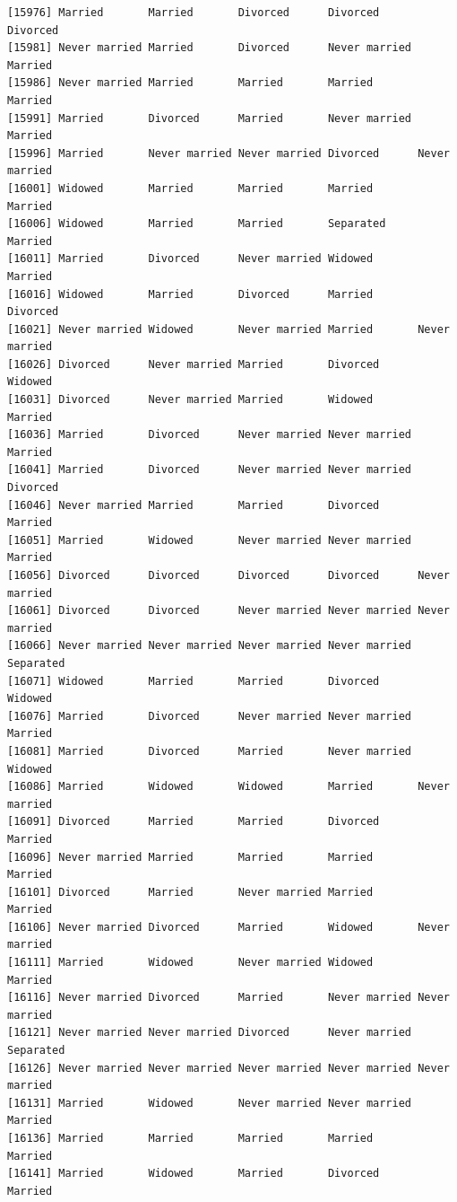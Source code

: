 \documentclass[
  letterpaper,
  DIV=11,
  numbers=noendperiod,
  oneside]{scrartcl}
\begin{document}
\begin{verbatim}
[15976] Married       Married       Divorced      Divorced      Divorced     
[15981] Never married Married       Divorced      Never married Married      
[15986] Never married Married       Married       Married       Married      
[15991] Married       Divorced      Married       Never married Married      
[15996] Married       Never married Never married Divorced      Never married
[16001] Widowed       Married       Married       Married       Married      
[16006] Widowed       Married       Married       Separated     Married      
[16011] Married       Divorced      Never married Widowed       Married      
[16016] Widowed       Married       Divorced      Married       Divorced     
[16021] Never married Widowed       Never married Married       Never married
[16026] Divorced      Never married Married       Divorced      Widowed      
[16031] Divorced      Never married Married       Widowed       Married      
[16036] Married       Divorced      Never married Never married Married      
[16041] Married       Divorced      Never married Never married Divorced     
[16046] Never married Married       Married       Divorced      Married      
[16051] Married       Widowed       Never married Never married Married      
[16056] Divorced      Divorced      Divorced      Divorced      Never married
[16061] Divorced      Divorced      Never married Never married Never married
[16066] Never married Never married Never married Never married Separated    
[16071] Widowed       Married       Married       Divorced      Widowed      
[16076] Married       Divorced      Never married Never married Married      
[16081] Married       Divorced      Married       Never married Widowed      
[16086] Married       Widowed       Widowed       Married       Never married
[16091] Divorced      Married       Married       Divorced      Married      
[16096] Never married Married       Married       Married       Married      
[16101] Divorced      Married       Never married Married       Married      
[16106] Never married Divorced      Married       Widowed       Never married
[16111] Married       Widowed       Never married Widowed       Married      
[16116] Never married Divorced      Married       Never married Never married
[16121] Never married Never married Divorced      Never married Separated    
[16126] Never married Never married Never married Never married Never married
[16131] Married       Widowed       Never married Never married Married      
[16136] Married       Married       Married       Married       Married      
[16141] Married       Widowed       Married       Divorced      Married      

\end{verbatim}
\end{document}
